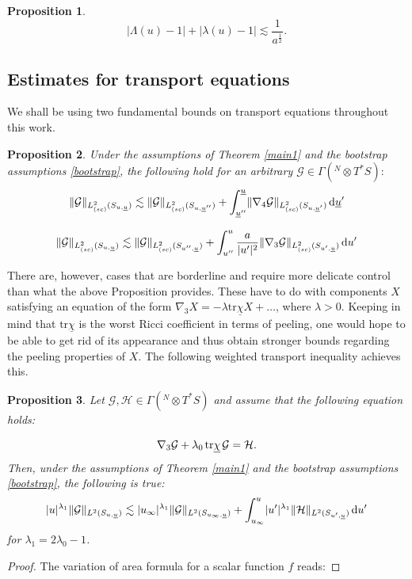 \documentclass{amsart}
\newtheorem{proposition}{Proposition}[section]
\newcommand{\twoSuprime}[1]{\lVert #1 \rVert_{L^2(S_{u^{\prime},\ubar})}}
\newcommand{\hsp}{\hspace{.5mm}}
\newcommand{\dubarprime}{\hspace{.5mm} \text{d} \ubar^{\prime}}
\newcommand{\intu}{\int_{u_{\infty}}^u}
\newcommand{\upr}{\lvert u^\prime \rvert}
\newcommand{\al}{a^{\frac{1}{2}}}
\newcommand{\chibar}{\underline{\chi}}
\newcommand{\ubar}{\underline{u}}
\newcommand{\twoSu}[1]{\lVert{#1} \rVert_{L^2(S_{u,\ubar})}}
\newcommand{\scaletwoSu}[1]{\lVert{#1} \rVert_{L^2_{(sc)}(S_{u,\ubar})}}
\newcommand{\scaletwoSuprime}[1]{\lVert{#1} \rVert_{L^2_{(sc)}(S_{u^\prime,\ubar})}}
\newcommand{\scaletwoSuubarprime}[1]{\lVert{#1} \rVert_{L^2_{(sc)}(S_{u,\ubar^\prime})}}
\newcommand{\duprime}{\hspace{.5mm} \text{d}u^{\prime}}
\newcommand{\aupr}{\frac{a}{\upr^2}}
\newcommand{\tr}{\mbox{tr}}
\begin{document}
{\begin{proposition}
\[    \lvert \Lambda(u)-1 \rvert + \lvert \lambda(u)-1 \rvert \lesssim \frac{1}{\al}. \]
\end{proposition}



\subsection{Estimates for transport equations}
We shall be using two fundamental bounds on transport equations throughout this work. 

 \begin{proposition} \label{3.5}
Under the assumptions of Theorem \ref{main1} and the bootstrap assumptions \eqref{bootstrap}, the following hold for an arbitrary $\mathcal{G} \in \Gamma(^{N}\otimes T^{*}S):$
\begin{equation}
\scaletwoSu{\mathcal{G}} \lesssim \lVert \mathcal{G} \rVert_{L^2_{(sc)}(S_{u,\ubar^{\prime\prime}})} + \int_{\ubar^{\prime\prime}}^{\ubar}  \scaletwoSuubarprime{\nabla_4 \mathcal{G}} \dubarprime 
\end{equation}

\begin{equation}
\scaletwoSu{\mathcal{G}} \lesssim \lVert \mathcal{G} \rVert_{L^2_{(sc)}(S_{u^{\prime\prime},\ubar})} + \int_{u^{\prime\prime}}^{u} \aupr  \scaletwoSuprime{\nabla_3 \mathcal{G}} \duprime
\end{equation}
\end{proposition}
\noindent There are, however, cases that are borderline and require more delicate control than what the above Proposition provides. These have to do with components $X$ satisfying an equation of the form $\nabla_3 X= - \lambda \tr\chibar X + \dots$, where $\lambda >0$. Keeping in mind that $\tr\chibar$ is the worst Ricci coefficient in terms of peeling, one would hope to be able to get rid of its appearance and thus obtain stronger bounds regarding the peeling properties of $X$. The following weighted transport inequality achieves this.

\begin{proposition} \label{3.6}
Let $\mathcal{G}, \mathcal{H} \in \Gamma(^{N}\otimes T^{*}S)$ and assume that the following equation holds:

\[ \nabla_3 \mathcal{G} + \lambda_0 \hsp \tr\chibar \hsp \mathcal{G} = \mathcal{H}.\]\label{36}
\noindent Then, under the assumptions of Theorem \ref{main1} and the bootstrap assumptions \eqref{bootstrap}, the following is true:
\[  \lvert u \rvert^{\lambda_1}\twoSu{\mathcal{G}}  \lesssim \lvert u_{\infty}\rvert^{\lambda_1}\lVert \mathcal{G} \rVert_{L^2(S_{u_{\infty}, \ubar})} + \intu \lvert u^{\prime}\rvert^{\lambda_1 } \twoSuprime{\mathcal{H}}\duprime      \]
for $\lambda_{1}=2\lambda_{0}-1$.
\end{proposition}
\begin{proof}
The variation of area formula for a scalar function $f$ reads:


\end{proof}}
\end{document}
